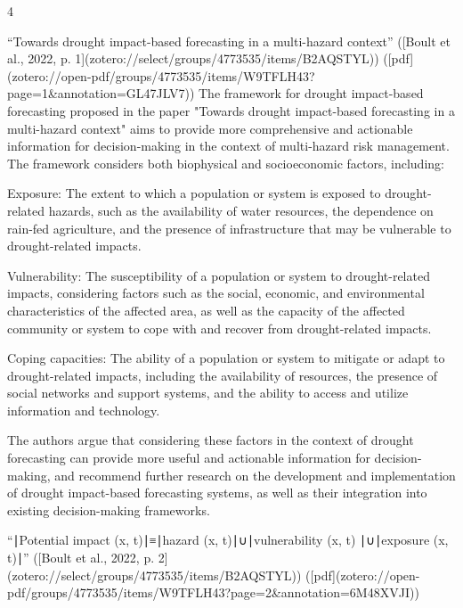 4





“Towards drought impact-based forecasting in a multi-hazard context” ([Boult et al., 2022, p. 1](zotero://select/groups/4773535/items/B2AQSTYL)) ([pdf](zotero://open-pdf/groups/4773535/items/W9TFLH43?page=1&annotation=GL47JLV7))
The framework for drought impact-based forecasting proposed in the paper "Towards drought impact-based forecasting in a multi-hazard context" aims to provide more comprehensive and actionable information for decision-making in the context of multi-hazard risk management. The framework considers both biophysical and socioeconomic factors, including:

Exposure: The extent to which a population or system is exposed to drought-related hazards, such as the availability of water resources, the dependence on rain-fed agriculture, and the presence of infrastructure that may be vulnerable to drought-related impacts.

Vulnerability: The susceptibility of a population or system to drought-related impacts, considering factors such as the social, economic, and environmental characteristics of the affected area, as well as the capacity of the affected community or system to cope with and recover from drought-related impacts.

Coping capacities: The ability of a population or system to mitigate or adapt to drought-related impacts, including the availability of resources, the presence of social networks and support systems, and the ability to access and utilize information and technology.

The authors argue that considering these factors in the context of drought forecasting can provide more useful and actionable information for decision-making, and recommend further research on the development and implementation of drought impact-based forecasting systems, as well as their integration into existing decision-making frameworks.


“∣Potential impact (x, t)∣≡∣hazard (x, t)∣∪∣vulnerability (x, t) ∣∪∣exposure (x, t)∣” ([Boult et al., 2022, p. 2](zotero://select/groups/4773535/items/B2AQSTYL)) ([pdf](zotero://open-pdf/groups/4773535/items/W9TFLH43?page=2&annotation=6M48XVJI))


